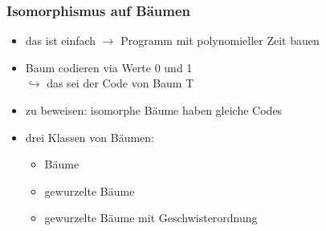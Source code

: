 \subsubsection{Isomorphismus auf Bäumen}
\begin{itemize}
	\item \glqq das ist einfach\grqq{} $\rightarrow$ Programm mit polynomieller Zeit bauen
	\item Baum codieren via Werte 0 und 1\\
\hspace*{2cm}$\hookrightarrow$ das sei der Code von Baum T
	\item zu beweisen: isomorphe Bäume haben gleiche Codes
	\item drei Klassen von Bäumen:
	\begin{itemize}
		\item Bäume
		\item gewurzelte Bäume
		\item gewurzelte Bäume mit Geschwisterordnung
	\end{itemize}
\end{itemize}
\newpage

